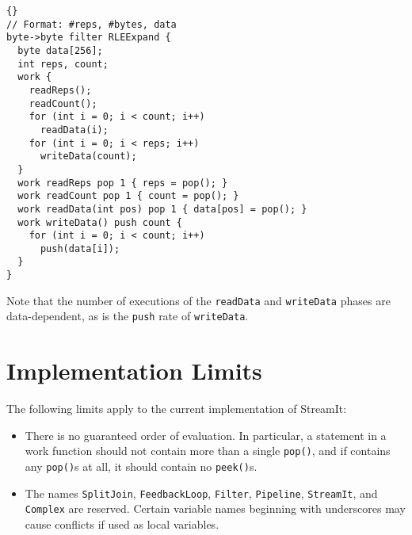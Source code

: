 \documentclass[11pt]{article}
\begin{document}
\begin{lstlisting}{}
// Format: #reps, #bytes, data
byte->byte filter RLEExpand {
  byte data[256];
  int reps, count;
  work {
    readReps();
    readCount();
    for (int i = 0; i < count; i++)
      readData(i);
    for (int i = 0; i < reps; i++)
      writeData(count);
  }
  work readReps pop 1 { reps = pop(); }
  work readCount pop 1 { count = pop(); }
  work readData(int pos) pop 1 { data[pos] = pop(); }
  work writeData() push count {
    for (int i = 0; i < count; i++)
      push(data[i]);
  }
}
\end{lstlisting}

Note that the number of executions of the \lstinline|readData| and
\lstinline|writeData| phases are data-dependent, as is the
\lstinline|push| rate of \lstinline|writeData|.

\section{Implementation Limits}

The following limits apply to the current implementation of StreamIt:

\begin{itemize}
\item There is no guaranteed order of evaluation.  In particular, a
  statement in a work function should not contain more than a single
  \lstinline|pop()|, and if contains any \lstinline|pop()|s at all, it
  should contain no \lstinline|peek()|s.
  
\item The names \lstinline|SplitJoin|, \lstinline|FeedbackLoop|,
  \lstinline|Filter|, \lstinline|Pipeline|, \lstinline|StreamIt|, and
  \lstinline|Complex| are reserved.  Certain variable names beginning
  with underscores may cause conflicts if used as local variables.

\end{itemize}
\end{document}
